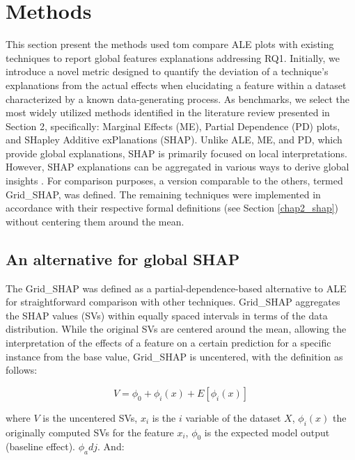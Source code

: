 \section{Methods}

This section present the methods used tom compare \gls{ALE} plots with existing techniques to report global features explanations addressing RQ1. Initially, we introduce a novel metric designed to quantify the deviation of a technique's explanations from the actual effects when elucidating a feature within a dataset characterized by a known data-generating process. As benchmarks, we select the most widely utilized methods identified in the literature review presented in Section 2, specifically: Marginal Effects (ME), Partial Dependence (PD) plots, and SHapley Additive exPlanations (SHAP). Unlike \gls{ALE}, \gls{ME}, and \gls{PD}, which provide global explanations, \gls{SHAP} is primarily focused on local interpretations. However, \gls{SHAP} explanations can be aggregated in various ways to derive global insights \cite{Lundberg2020FromTrees.}. For comparison purposes, a version comparable to the others, termed Grid\_SHAP, was defined. The remaining techniques were implemented in accordance with their respective formal definitions (see Section \ref{chap2_shap}) without centering them around the mean.


\subsection{An alternative for global SHAP}

The Grid\_SHAP was defined as a partial-dependence-based alternative to \gls{ALE} for straightforward comparison with other techniques. Grid\_SHAP aggregates the SHAP values (SVs) within equally spaced intervals in terms of the data distribution. While the original SVs are centered around the mean, allowing the interpretation of the effects of a feature on a certain prediction for a specific instance from the base value, Grid\_SHAP is uncentered, with the definition as follows:

\begin{equation}
 V = \phi_0 + \phi_i(x) + E[\phi_i(x)]
\label{shapley_1}
\end{equation}

where \(V\) is the uncentered SVs, $x_i$ is the $i$ variable of the dataset $X$, $\phi_i(x)$ the originally computed SVs for the feature $x_i$, $\phi_0$ is the expected model output (baseline effect).  $\phi_adj$. And:

